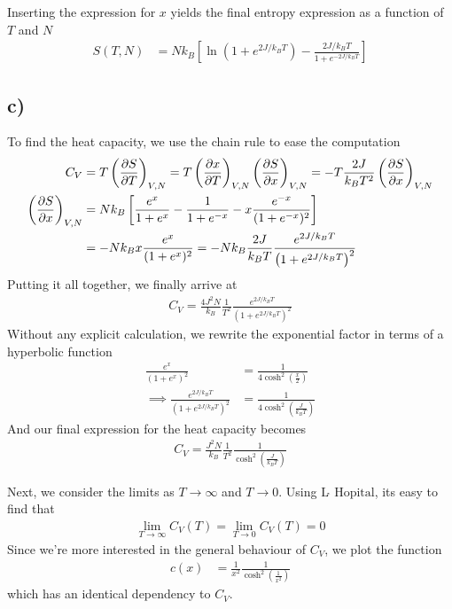 \documentclass[reprint,english,notitlepage,aps,nobalancelastpage,nofootinbib]{revtex4-1}
\newcommand{\closed}[1]{\left(#1\right)}
\newcommand{\bracket}[1]{\left[#1\right]}
\newcommand{\tmdv}[4]{\closed{\pdv{#1}{#2}}_{#3,#4}}
\newcommand{\kb}{k_B}
\begin{document}
Inserting the expression for $x$ yields the final entropy expression as a function of $T$ and $N$
\begin{align}
	S(T,N) &= N\kb \bracket{\ln\closed{1+e^{2J/\kb T}} - \frac{2J/\kb T}{1+e^{-2J/\kb T}}}
\end{align}

\subsection*{c)}
To find the heat capacity, we use the chain rule to ease the computation 
\begin{align*}
	C_V &= T\tmdv{S}{T}{V}{N} = T \tmdv{x}{T}{V}{N}\tmdv{S}{x}{V}{N} = -T\frac{2J}{\kb T^2}\tmdv{S}{x}{V}{N} \\ 
	\tmdv{S}{x}{V}{N} &= N\kb \bracket{\frac{e^x}{1+e^x} - \frac{1}{1+e^{-x}} -x \frac{e^{-x}}{(1+e^{-x})^2} } \\ 
	&= - N\kb x \frac{e^x}{(1+e^x)^2} = -N\kb \frac{2J}{\kb T} \frac{e^{2J/\kb T}}{\closed{1+e^{2J/\kb T}}^2}
\end{align*}
Putting it all together, we finally arrive at 
\begin{align*}
	C_V = \frac{4J^2 N}{\kb} \frac{1}{T^2} \frac{e^{2J/\kb T}}{\closed{1+e^{2J/\kb T}}^2}
\end{align*}
Without any explicit calculation, we rewrite the exponential factor in terms of a hyperbolic function 
\begin{align*}
	\frac{e^x}{(1+e^x)^2} &= \frac{1}{4\cosh^2(\frac{x}{2})} \\
	\implies \frac{e^{2J/\kb T}}{\closed{1+e^{2J/\kb T}}^2} &= \frac{1}{4 \cosh^2\closed{\frac{J}{\kb T}}}
\end{align*}
And our final expression for the heat capacity becomes 
\begin{align}
	C_V = \frac{J^2 N}{\kb} \frac{1}{T^2} \frac{1}{\cosh^2\closed{\frac{J}{\kb T}}}
\end{align}

Next, we consider the limits as $T\to\infty$ and $T\to0$. Using $\text{L}\hat{\;}\,\text{Hopital}$, its easy to find that 
\begin{align*}
	\lim_{T\to\infty} C_V(T) = \lim_{T\to0} C_V(T) = 0
\end{align*}
Since we're more interested in the general behaviour of $C_V$, we plot the function 
\begin{align*}
	c (x) &= \frac{1}{x^2} \frac{1}{\cosh^2\closed{\frac{1}{x^2}}}
\end{align*}
which has an identical dependency to $C_V$. 
\end{document}
